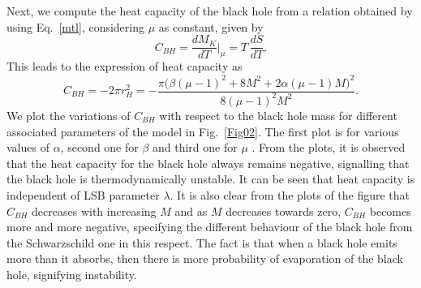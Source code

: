 \documentclass[aps,amsmath,amssymb,showpacs,showkeys]{revtex4}
\begin{document}
 Next, we compute the heat capacity of the black hole from a relation 
obtained by using Eq.\ \eqref{mtl}, considering $\mu$ as constant, given by
\begin{equation}
  C_{BH}=\frac{d M_K}{dT}\Big|_{\mu}=T\,\frac{dS}{dT}. 
\end{equation}
This leads to the expression of heat capacity as
\begin{equation}
 C_{BH}=-2\pi r_H^2= -\frac{\pi  \Big(\beta  (\mu -1)^2+8 M^2+2 \alpha  (\mu -1) M\Big)^2}{8 (\mu -1)^2 M^2}.
\label{Eq:15}
\end{equation}
We plot the variations of $C_{BH}$ with respect to the black hole mass 
for different associated parameters of the model in Fig.\ \ref{Fig02}. The 
first plot is for various values of $\alpha$, second one for $\beta$ and 
third one for $\mu$ . From the plots, it is observed that the heat capacity 
for the black hole always remains negative, signalling that the black hole is 
thermodynamically unstable. It can be seen that heat capacity is independent 
of LSB parameter $\lambda$. It is also clear from the plots of the figure that 
$C_{BH}$ decreases with increasing $M$ and as $M$ decreases towards zero, 
$C_{BH}$ becomes more and more negative, specifying the different behaviour of
the black hole from the Schwarzschild one in this respect. The fact is that 
when a black hole emits more than it absorbs, then there is more probability 
of evaporation of the black hole, signifying instability.
\end{document}
